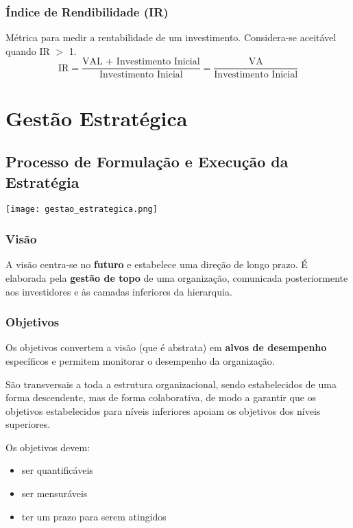 \documentclass[11pt]{article}
\begin{document}
\subsubsection{Índice de Rendibilidade (IR)}

Métrica para medir a rentabilidade de um investimento. Considera-se aceitável quando IR $>$ 1.
\begin{equation*}
    \text{IR} = \frac{\text{VAL + Investimento Inicial}}{\text{Investimento Inicial}}
    = \frac{\text{VA}}{\text{Investimento Inicial}}
\end{equation*}

\newpage

\section{Gestão Estratégica}

\subsection{Processo de Formulação e Execução da Estratégia}

\texttt{[image: gestao\_estrategica.png]}

\subsubsection{Visão}

A visão centra-se no \textbf{futuro} e estabelece uma direção de longo prazo. É elaborada pela \textbf{gestão de topo} de uma organização, comunicada posteriormente aos investidores e às camadas inferiores da hierarquia.

\subsubsection{Objetivos}

Os objetivos convertem a visão (que é abstrata) em \textbf{alvos de desempenho} específicos e permitem monitorar o desempenho da organização.

São transversais a toda a estrutura organizacional, sendo estabelecidos de uma forma descendente, mas de forma colaborativa, de modo a garantir que os objetivos estabelecidos para níveis inferiores apoiam os objetivos dos níveis superiores.

Os objetivos devem:
\begin{itemize}[topsep=-4pt,itemsep=0pt]
    \item ser quantificáveis
    \item ser mensuráveis
    \item ter um prazo para serem atingidos
\end{itemize}
\end{document}
